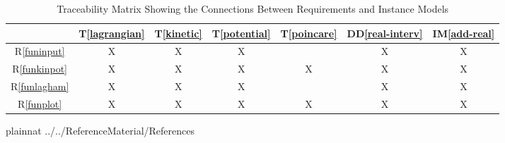\documentclass[12pt]{article}
\newcommand{\ddref}[1]{DD\ref{#1}}
\newcommand{\tref}[1]{T\ref{#1}}
\newcommand{\iref}[1]{IM\ref{#1}}
\newcommand{\rref}[1]{R\ref{#1}}
\begin{document}
\begin{table}[h!]
	\centering
	\begin{tabular}{|c|c|c|c|c|c|c|}
		\hline        
		& \tref{lagrangian}
		& \tref{kinetic}
		& \tref{potential}
		& \tref{poincare}
		& \ddref{real-interv}
		& \iref{add-real} \\
		\hline
        \rref{funinput} & X & X & X &  & X & X \\ \hline
        \rref{funkinpot} & X & X & X & X & X & X\\ \hline
        \rref{funlagham} & X & X & X &  & X & X \\ \hline
        \rref{funplot} & X & X & X & X & X & X\\ \hline
	\end{tabular}
	\caption{Traceability Matrix Showing the Connections Between 
	Requirements and Instance Models}
	\label{Table:R_trace}
\end{table}




\newpage

 {plainnat}
 {../../ReferenceMaterial/References}
\end{document}
